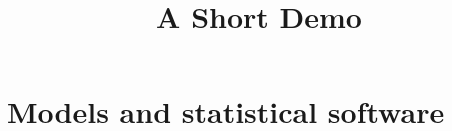 \documentclass[article]{jss}
\title{A Short Demo}
\begin{document}
\section{Models and statistical software}
\end{document}
